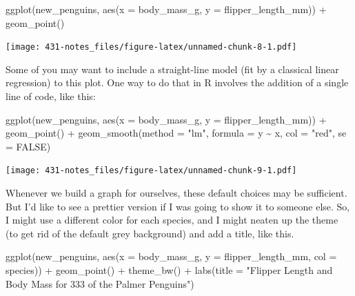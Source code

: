 \documentclass[
]{book}
\newenvironment{Shaded}{\begin{snugshade}}{\end{snugshade}}
\newcommand{\AttributeTok}[1]{\textcolor[rgb]{0.77,0.63,0.00}{#1}}
\newcommand{\ConstantTok}[1]{\textcolor[rgb]{0.00,0.00,0.00}{#1}}
\newcommand{\FunctionTok}[1]{\textcolor[rgb]{0.00,0.00,0.00}{#1}}
\newcommand{\NormalTok}[1]{#1}
\newcommand{\SpecialCharTok}[1]{\textcolor[rgb]{0.00,0.00,0.00}{#1}}
\newcommand{\StringTok}[1]{\textcolor[rgb]{0.31,0.60,0.02}{#1}}
\begin{document}
\begin{Shaded}
\begin{Highlighting}[]
\FunctionTok{ggplot}\NormalTok{(new\_penguins, }\FunctionTok{aes}\NormalTok{(}\AttributeTok{x =}\NormalTok{ body\_mass\_g, }\AttributeTok{y =}\NormalTok{ flipper\_length\_mm)) }\SpecialCharTok{+}
    \FunctionTok{geom\_point}\NormalTok{() }
\end{Highlighting}
\end{Shaded}

\texttt{[image: 431-notes\_files/figure-latex/unnamed-chunk-8-1.pdf]}

Some of you may want to include a straight-line model (fit by a classical linear regression) to this plot. One way to do that in R involves the addition of a single line of code, like this:

\begin{Shaded}
\begin{Highlighting}[]
\FunctionTok{ggplot}\NormalTok{(new\_penguins, }\FunctionTok{aes}\NormalTok{(}\AttributeTok{x =}\NormalTok{ body\_mass\_g, }\AttributeTok{y =}\NormalTok{ flipper\_length\_mm)) }\SpecialCharTok{+}
    \FunctionTok{geom\_point}\NormalTok{() }\SpecialCharTok{+}
    \FunctionTok{geom\_smooth}\NormalTok{(}\AttributeTok{method =} \StringTok{"lm"}\NormalTok{, }\AttributeTok{formula =}\NormalTok{ y }\SpecialCharTok{\textasciitilde{}}\NormalTok{ x,}
                \AttributeTok{col =} \StringTok{"red"}\NormalTok{, }\AttributeTok{se =} \ConstantTok{FALSE}\NormalTok{)}
\end{Highlighting}
\end{Shaded}

\texttt{[image: 431-notes\_files/figure-latex/unnamed-chunk-9-1.pdf]}

Whenever we build a graph for ourselves, these default choices may be sufficient. But I'd like to see a prettier version if I was going to show it to someone else. So, I might use a different color for each species, and I might neaten up the theme (to get rid of the default grey background) and add a title, like this.

\begin{Shaded}
\begin{Highlighting}[]
\FunctionTok{ggplot}\NormalTok{(new\_penguins, }\FunctionTok{aes}\NormalTok{(}\AttributeTok{x =}\NormalTok{ body\_mass\_g, }\AttributeTok{y =}\NormalTok{ flipper\_length\_mm, }\AttributeTok{col =}\NormalTok{ species)) }\SpecialCharTok{+}
    \FunctionTok{geom\_point}\NormalTok{() }\SpecialCharTok{+} 
    \FunctionTok{theme\_bw}\NormalTok{() }\SpecialCharTok{+} 
    \FunctionTok{labs}\NormalTok{(}\AttributeTok{title =} \StringTok{"Flipper Length and Body Mass for 333 of the Palmer Penguins"}\NormalTok{)}
\end{Highlighting}
\end{Shaded}
\end{document}

